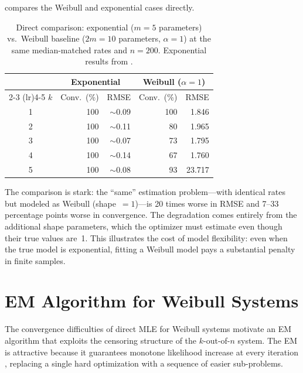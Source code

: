\documentclass[12pt]{article}
\theoremstyle{definition}
\theoremstyle{remark}
\begin{document}
 compares the Weibull and exponential
cases directly.

\begin{table}[t]
\centering
\caption{%
  Direct comparison: exponential ($m = 5$ parameters) vs.\ Weibull
  baseline ($2m = 10$ parameters, $\alpha = 1$) at the same
  median-matched rates and $n = 200$.  Exponential results from
  \citet{Towell2026}.
}
\label{tab:exp-comparison}
\small
\begin{tabular}{c rr rr}
\toprule
& \multicolumn{2}{c}{Exponential} &
  \multicolumn{2}{c}{Weibull ($\alpha = 1$)} \\
\cmidrule(lr){2-3} \cmidrule(lr){4-5}
$k$ & Conv.\ (\%) & RMSE & Conv.\ (\%) & RMSE \\
\midrule
1 & 100 & $\sim$0.09 & 100 & 1.846 \\
2 & 100 & $\sim$0.11 & 80  & 1.965 \\
3 & 100 & $\sim$0.07 & 73  & 1.795 \\
4 & 100 & $\sim$0.14 & 67  & 1.760 \\
5 & 100 & $\sim$0.08 & 93  & 23.717 \\
\bottomrule
\end{tabular}
\end{table}

The comparison is stark: the ``same'' estimation problem---with
identical rates but modeled as Weibull (shape~$= 1$)---is
20 times worse in RMSE and 7--33 percentage points worse in
convergence.  The degradation comes entirely from the additional
shape parameters, which the optimizer must estimate even though
their true values are~1.  This illustrates the cost of model
flexibility: even when the true model is exponential, fitting a
Weibull model pays a substantial penalty in finite samples.


\section{EM Algorithm for Weibull Systems}
\label{sec:em-algorithm}

The convergence difficulties of direct MLE for Weibull systems
motivate an EM algorithm that exploits the censoring structure of
the $k$-out-of-$n$ system.  The EM is attractive because it
guarantees monotone likelihood increase at every iteration
\citep{DempsterLairdRubin1977, Wu1983}, replacing a single hard
optimization with a sequence of easier sub-problems.
\end{document}
